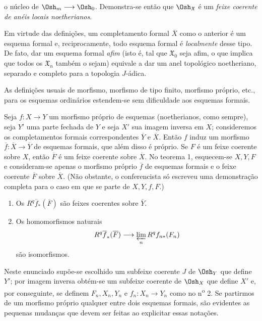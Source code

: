 o núcleo de $\Osh_m\longrightarrow\Osh_0$. Demonstra-se então que
$\Osh_{\mathfrak X}$ é um \emph{feixe coerente de anéis locais
noetherianos}.

Em virtude das definições, um completamento formal $\overline X$ como o
anterior é um esquema formal e, reciprocamente, todo esquema formal é
\emph{localmente} desse tipo. De fato, dar um esquema formal \emph{afim} (isto
é, tal que $\mathfrak X_0$ seja afim, o que implica que todos os
$\mathfrak X_n$ também o sejam) equivale a dar um anel topológico noetheriano,
separado e completo para a topologia $J$-ádica.

As definições usuais de morfismo, morfismo de tipo finito, morfismo
próprio, etc., para os esquemas ordinários estendem-se sem dificuldade aos
esquemas formais.


Seja $f:X\longrightarrow Y$ um morfismo próprio de esquemas (noetherianos, como
sempre), seja $Y'$ uma parte fechada de $Y$ e seja $X'$ sua imagem inversa em
$X$; consideremos os completamentos formais correspondentes $\overline Y$ e
$\overline X$. Então $f$ induz um morfismo
$\overline f:\overline X\longrightarrow\overline Y$ de esquemas formais, que
além disso é próprio. Se $F$ é um feixe coerente sobre $X$, então $\overline F$
é um feixe coerente sobre $\overline X$. No teorema 1, esquecem-se $X,Y,F$ e
consideram-se apenas o morfismo próprio $\overline f$ de esquemas formais e o
feixe coerente $\overline F$ sobre $\overline X$. (Não obstante, o conferencista
só escreveu uma demonstração completa para o caso em que se parte de
$X,Y,f,F$.)

\begin{enumerate}
  \item[\textit{i.}] Os $R^{q}\overline f_{*}(\overline F)$ são feixes
    coerentes sobre $\overline Y$.
  \item[\textit{ii.}] Os homomorfismos naturais
    \[
      R^{q}\overline f_{*}(\overline F)
      \longrightarrow \varprojlim_n R^{q}f_{n*}(F_n)
    \]
    são isomorfismos.
\end{enumerate}

Neste enunciado supõe-se escolhido um subfeixe coerente $J$ de $\Osh_Y$ que
define $Y'$; por imagem inversa obtém-se um subfeixe coerente de $\Osh_X$ que
define $X'$ e, por conseguinte, se definem $F_n,X_n,Y_n$ e
$f_n:X_n\longrightarrow Y_n$ como no n\textsuperscript{o} 2. Se partirmos de
um morfismo próprio qualquer entre dois esquemas formais, são evidentes as
pequenas mudanças que devem ser feitas ao explicitar essas notações.

